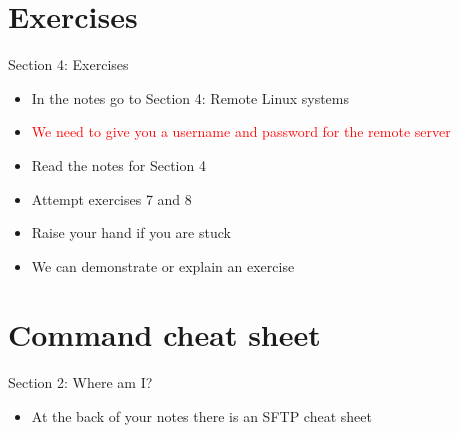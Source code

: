 \section{Exercises}
\begin{frame}{Section 4: Exercises}
\begin{itemize}
\item In the notes go to Section 4: Remote Linux systems
\item {\textcolor{red}{We need to give you a username and password for the remote server}}
\item Read the notes for Section 4
\item Attempt exercises 7 and 8
\item Raise your hand if you are stuck
\item We can demonstrate or explain an exercise
\end{itemize}
\end{frame}

\section{Command cheat sheet}
\begin{frame}{Section 2: Where am I?}
\begin{itemize}
\item At the back of your notes there is an SFTP cheat sheet
\end{itemize}
\end{frame}